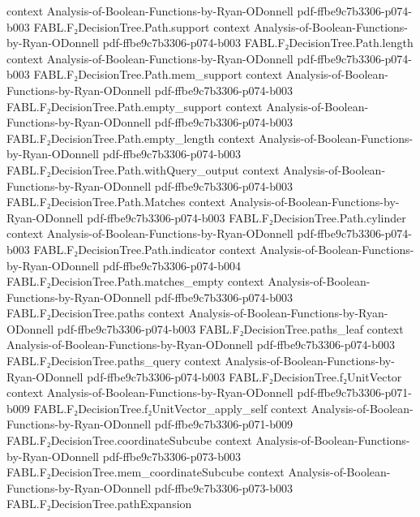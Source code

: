 \begin{theorem}
  {context}
  {Analysis-of-Boolean-Functions-by-Ryan-ODonnell}
  {pdf-ffbe9c7b3306-p074-b003}
\proofstep
  {FABL.F₂DecisionTree.Path.support}
  {context}
  {Analysis-of-Boolean-Functions-by-Ryan-ODonnell}
  {pdf-ffbe9c7b3306-p074-b003}
\proofstep
  {FABL.F₂DecisionTree.Path.length}
  {context}
  {Analysis-of-Boolean-Functions-by-Ryan-ODonnell}
  {pdf-ffbe9c7b3306-p074-b003}
\proofstep
  {FABL.F₂DecisionTree.Path.mem_support}
  {context}
  {Analysis-of-Boolean-Functions-by-Ryan-ODonnell}
  {pdf-ffbe9c7b3306-p074-b003}
\proofstep
  {FABL.F₂DecisionTree.Path.empty_support}
  {context}
  {Analysis-of-Boolean-Functions-by-Ryan-ODonnell}
  {pdf-ffbe9c7b3306-p074-b003}
\proofstep
  {FABL.F₂DecisionTree.Path.empty_length}
  {context}
  {Analysis-of-Boolean-Functions-by-Ryan-ODonnell}
  {pdf-ffbe9c7b3306-p074-b003}
\proofstep
  {FABL.F₂DecisionTree.Path.withQuery_output}
  {context}
  {Analysis-of-Boolean-Functions-by-Ryan-ODonnell}
  {pdf-ffbe9c7b3306-p074-b003}
\proofstep
  {FABL.F₂DecisionTree.Path.Matches}
  {context}
  {Analysis-of-Boolean-Functions-by-Ryan-ODonnell}
  {pdf-ffbe9c7b3306-p074-b003}
\proofstep
  {FABL.F₂DecisionTree.Path.cylinder}
  {context}
  {Analysis-of-Boolean-Functions-by-Ryan-ODonnell}
  {pdf-ffbe9c7b3306-p074-b003}
\proofstep
  {FABL.F₂DecisionTree.Path.indicator}
  {context}
  {Analysis-of-Boolean-Functions-by-Ryan-ODonnell}
  {pdf-ffbe9c7b3306-p074-b004}
\proofstep
  {FABL.F₂DecisionTree.Path.matches_empty}
  {context}
  {Analysis-of-Boolean-Functions-by-Ryan-ODonnell}
  {pdf-ffbe9c7b3306-p074-b003}
\proofstep
  {FABL.F₂DecisionTree.paths}
  {context}
  {Analysis-of-Boolean-Functions-by-Ryan-ODonnell}
  {pdf-ffbe9c7b3306-p074-b003}
\proofstep
  {FABL.F₂DecisionTree.paths_leaf}
  {context}
  {Analysis-of-Boolean-Functions-by-Ryan-ODonnell}
  {pdf-ffbe9c7b3306-p074-b003}
\proofstep
  {FABL.F₂DecisionTree.paths_query}
  {context}
  {Analysis-of-Boolean-Functions-by-Ryan-ODonnell}
  {pdf-ffbe9c7b3306-p074-b003}
\proofstep
  {FABL.F₂DecisionTree.f₂UnitVector}
  {context}
  {Analysis-of-Boolean-Functions-by-Ryan-ODonnell}
  {pdf-ffbe9c7b3306-p071-b009}
\proofstep
  {FABL.F₂DecisionTree.f₂UnitVector_apply_self}
  {context}
  {Analysis-of-Boolean-Functions-by-Ryan-ODonnell}
  {pdf-ffbe9c7b3306-p071-b009}
\proofstep
  {FABL.F₂DecisionTree.coordinateSubcube}
  {context}
  {Analysis-of-Boolean-Functions-by-Ryan-ODonnell}
  {pdf-ffbe9c7b3306-p073-b003}
\proofstep
  {FABL.F₂DecisionTree.mem_coordinateSubcube}
  {context}
  {Analysis-of-Boolean-Functions-by-Ryan-ODonnell}
  {pdf-ffbe9c7b3306-p073-b003}
\proofstep
  {FABL.F₂DecisionTree.pathExpansion}

\end{theorem}
